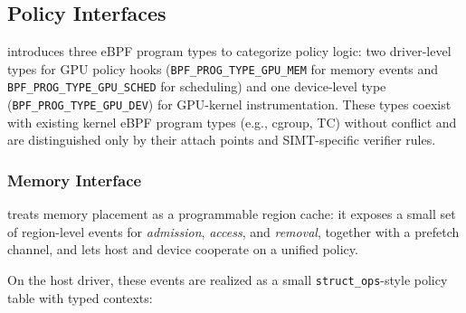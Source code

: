 
\subsection{Policy Interfaces}
\label{sec:design-interfaces}

\sys introduces three eBPF program types to categorize policy logic:
two driver-level types for GPU policy hooks (\texttt{BPF\_PROG\_TYPE\_GPU\_MEM} for memory events and \texttt{BPF\_PROG\_TYPE\_GPU\_SCHED} for scheduling) and one device-level type (\texttt{BPF\_PROG\_TYPE\_GPU\_DEV}) for GPU-kernel instrumentation. These types coexist with existing kernel eBPF program types (e.g., cgroup, TC) without conflict and are distinguished only by their attach points and SIMT-specific verifier rules.

\subsubsection{Memory Interface}
\label{sec:design-mem}

\sys treats memory placement as a programmable region
cache: it exposes a small set of region-level events for \emph{admission},
\emph{access}, and \emph{removal}, together with a prefetch channel, and lets host
and device cooperate on a unified policy.

On the host driver, these events are realized as a small \texttt{struct\_ops}-style policy
table with typed contexts:




